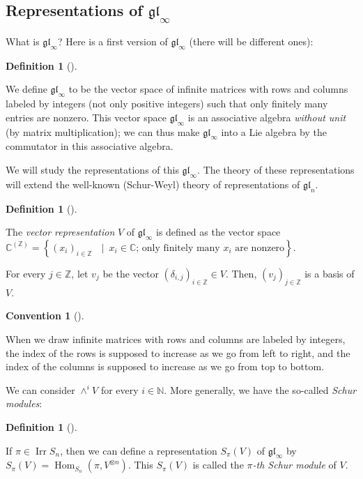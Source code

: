 \documentclass
[numbers=enddot,12pt,final,onecolumn,german,notitlepage]{scrartcl}%
\theoremstyle{definition}
\newtheorem{defi}[theo]{Definition}
\newenvironment{definition}[1][]
{\begin{defi}[#1]\begin{leftbar}}
{\end{leftbar}\end{defi}}
\newtheorem{conv}[theo]{Convention}
\newenvironment{Convention}[1][]
{\begin{conv}[#1]\begin{leftbar}}
{\end{leftbar}\end{conv}}
\begin{document}
\subsection{Representations of $\mathfrak{gl}_{\infty}$}

What is $\mathfrak{gl}_{\infty}$? Here is a first version of $\mathfrak{gl}%
_{\infty}$ (there will be different ones):

\begin{definition}
We define $\mathfrak{gl}_{\infty}$ to be the vector space of infinite matrices
with rows and columns labeled by integers (not only positive integers) such
that only finitely many entries are nonzero. This vector space $\mathfrak{gl}%
_{\infty}$ is an associative algebra \textit{without unit} (by matrix
multiplication); we can thus make $\mathfrak{gl}_{\infty}$ into a Lie algebra
by the commutator in this associative algebra.
\end{definition}

We will study the representations of this $\mathfrak{gl}_{\infty}$. The theory
of these representations will extend the well-known (Schur-Weyl) theory of
representations of $\mathfrak{gl}_{n}$.

\begin{definition}
The \textit{vector representation} $V$ of $\mathfrak{gl}_{\infty}$ is defined
as the vector space $\mathbb{C}^{\left(  \mathbb{Z}\right)  }=\left\{  \left(
x_{i}\right)  _{i\in\mathbb{Z}}\text{\ }\mid\ x_{i}\in\mathbb{C}\text{; only
finitely many }x_{i}\text{ are nonzero}\right\}  $.

For every $j\in\mathbb{Z}$, let $v_{j}$ be the vector $\left(  \delta
_{i,j}\right)  _{i\in\mathbb{Z}}\in V$. Then, $\left(  v_{j}\right)
_{j\in\mathbb{Z}}$ is a basis of $V$.
\end{definition}

\begin{Convention}
When we draw infinite matrices with rows and columns are labeled by integers,
the index of the rows is supposed to increase as we go from left to right, and
the index of the columns is supposed to increase as we go from top to bottom.
\end{Convention}

We can consider $\wedge^{i}V$ for every $i\in\mathbb{N}$. More generally, we
have the so-called \textit{Schur modules}:

\begin{definition}
If $\pi\in\operatorname*{Irr}S_{n}$, then we can define a representation
$S_{\pi}\left(  V\right)  $ of $\mathfrak{gl}_{\infty}$ by $S_{\pi}\left(
V\right)  =\operatorname*{Hom}\nolimits_{S_{n}}\left(  \pi,V^{\otimes
n}\right)  $. This $S_{\pi}\left(  V\right)  $ is called the $\pi$\textit{-th
Schur module} of $V$.
\end{definition}
\end{document}
